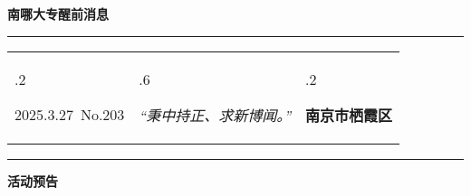 \documentclass[letterpaper, 12pt]{article}
\begin{document}
\begin{center}
    \Huge\textbf{南哪大专醒前消息}
\end{center}
\vspace{4mm}
\hrule
\renewcommand\tabularxcolumn[1]{m{#1}}
\begin{tabularx}{\textwidth}{>{\hsize.2\hsize}X>{\hsize.6\hsize}X>{\hsize.2\hsize}X}
    \begin{flushleft}
        2025.3.27\, No.203
    \end{flushleft}
    &
    \begin{center}
        \textit{“秉中持正、求新博闻。”}
    \end{center}
    &
    \begin{flushright}
        \textbf{南京市栖霞区}
    \end{flushright}
\end{tabularx}
\vspace{-3.5mm}
\hrule
\vspace{4mm}
\centerline{\huge\textbf{活动预告}}
\end{document}
